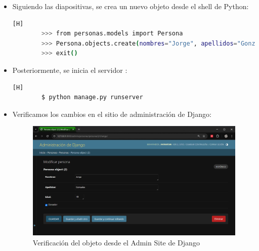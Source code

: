 \documentclass{article}
\begin{document}
\begin{itemize}
            \item Siguiendo las diapositivas, se crea un nuevo objeto desde el shell de Python:
        
        \begin{lstlisting}[language=bash,caption={Creación de un nuevo objeto desde el shell}][H]
        >>> from personas.models import Persona
        >>> Persona.objects.create(nombres="Jorge", apellidos="Gonzales", edad="18")
        >>> exit()
        \end{lstlisting}
            \item Posteriormente, se inicia el servidor :
        \begin{lstlisting}[language=bash,caption={Activación del servidor}][H]
        $ python manage.py runserver
        \end{lstlisting}
            \item Verificamos los cambios en el sitio de administración de Django:
        \begin{figure}[H]
            \centering
            \includegraphics[width=1\linewidth]{img/Persona2.png}
            \caption{Verificación del objeto desde el Admin Site de Django}
            \label{fig:enter-label}
        \end{figure}
        \end{itemize}
        
\end{document}
